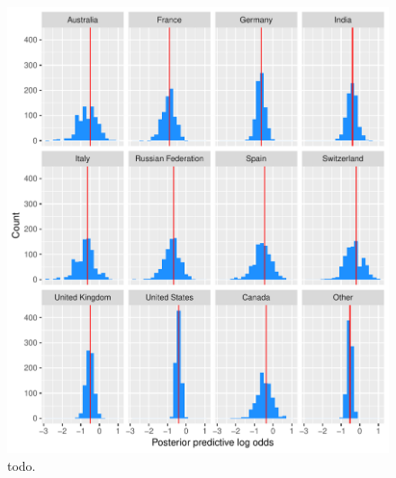 \documentclass{article}
\begin{document}
\begin{figure}[H]
\centering
\includegraphics{report-010}
\caption{todo.}\label{fig_1}
\end{figure}
\end{document}
